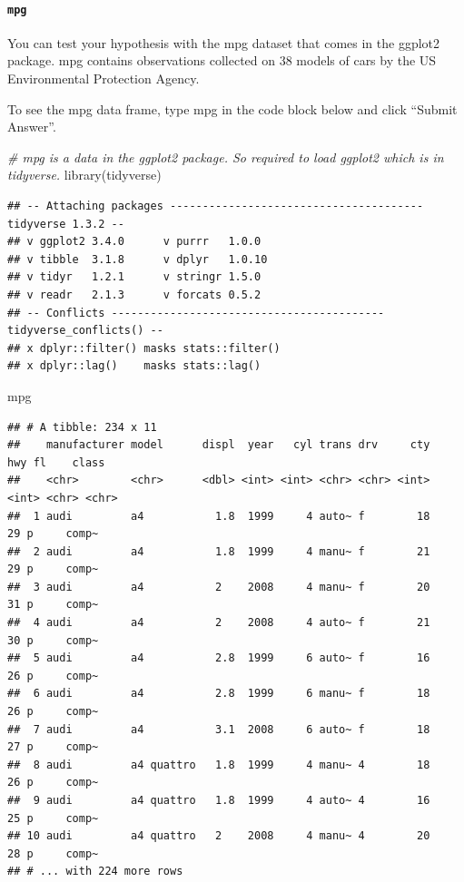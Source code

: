 \documentclass[
]{article}
\newenvironment{Shaded}{\begin{snugshade}}{\end{snugshade}}
\newcommand{\CommentTok}[1]{\textcolor[rgb]{0.56,0.35,0.01}{\textit{#1}}}
\newcommand{\FunctionTok}[1]{\textcolor[rgb]{0.00,0.00,0.00}{#1}}
\newcommand{\NormalTok}[1]{#1}
\begin{document}
\hypertarget{mpg}{%
\paragraph{\texorpdfstring{\texttt{mpg}}{mpg}}\label{mpg}}

You can test your hypothesis with the mpg dataset that comes in the
ggplot2 package. mpg contains observations collected on 38 models of
cars by the US Environmental Protection Agency.

To see the mpg data frame, type mpg in the code block below and click
``Submit Answer''.

\begin{Shaded}
\begin{Highlighting}[]
\CommentTok{\# mpg is a data in the ggplot2 package. So required to load ggplot2 which is in tidyverse.}
\FunctionTok{library}\NormalTok{(tidyverse)}
\end{Highlighting}
\end{Shaded}

\begin{verbatim}
## -- Attaching packages --------------------------------------- tidyverse 1.3.2 --
## v ggplot2 3.4.0      v purrr   1.0.0 
## v tibble  3.1.8      v dplyr   1.0.10
## v tidyr   1.2.1      v stringr 1.5.0 
## v readr   2.1.3      v forcats 0.5.2 
## -- Conflicts ------------------------------------------ tidyverse_conflicts() --
## x dplyr::filter() masks stats::filter()
## x dplyr::lag()    masks stats::lag()
\end{verbatim}

\begin{Shaded}
\begin{Highlighting}[]
\NormalTok{mpg}
\end{Highlighting}
\end{Shaded}

\begin{verbatim}
## # A tibble: 234 x 11
##    manufacturer model      displ  year   cyl trans drv     cty   hwy fl    class
##    <chr>        <chr>      <dbl> <int> <int> <chr> <chr> <int> <int> <chr> <chr>
##  1 audi         a4           1.8  1999     4 auto~ f        18    29 p     comp~
##  2 audi         a4           1.8  1999     4 manu~ f        21    29 p     comp~
##  3 audi         a4           2    2008     4 manu~ f        20    31 p     comp~
##  4 audi         a4           2    2008     4 auto~ f        21    30 p     comp~
##  5 audi         a4           2.8  1999     6 auto~ f        16    26 p     comp~
##  6 audi         a4           2.8  1999     6 manu~ f        18    26 p     comp~
##  7 audi         a4           3.1  2008     6 auto~ f        18    27 p     comp~
##  8 audi         a4 quattro   1.8  1999     4 manu~ 4        18    26 p     comp~
##  9 audi         a4 quattro   1.8  1999     4 auto~ 4        16    25 p     comp~
## 10 audi         a4 quattro   2    2008     4 manu~ 4        20    28 p     comp~
## # ... with 224 more rows
\end{verbatim}
\end{document}
